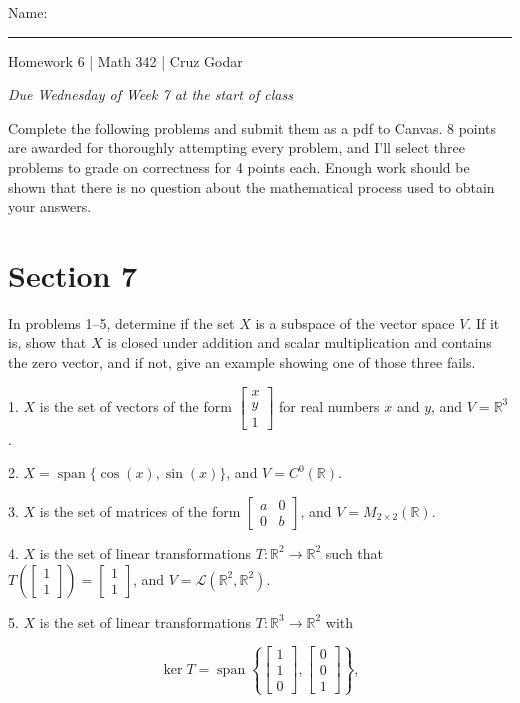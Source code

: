 \documentclass{article}
\begin{document}
\Large Name: \rule{2in}{0.15mm} \hfill Homework 6 | Math 342 | Cruz Godar \vspace{4pt} \normalsize

\textit{Due Wednesday of Week 7 at the start of class}

Complete the following problems and submit them as a pdf to Canvas. 8 points are awarded for thoroughly attempting every problem, and I'll select three problems to grade on correctness for 4 points each. Enough work should be shown that there is no question about the mathematical process used to obtain your answers.

\section{Section 7}

In problems 1--5, determine if the set $X$ is a subspace of the vector space $V$. If it is, show that $X$ is closed under addition and scalar multiplication and contains the zero vector, and if not, give an example showing one of those three fails.

1. $X$ is the set of vectors of the form $\left[\begin{array}{c} x \\ y \\ 1 \end{array}\right]$ for real numbers $x$ and $y$, and $V = \mathbb{R}^3$.

2. $X = \operatorname{span} \{ \cos(x), \sin(x) \}$, and $V = C^0(\mathbb{R})$.

3. $X$ is the set of matrices of the form $\left[\begin{array}{cc} a& 0 \\ 0& b \end{array}\right]$, and $V = M_{2 \times 2}(\mathbb{R})$.

4. $X$ is the set of linear transformations $T : \mathbb{R}^2 \to \mathbb{R}^2$ such that $T \left( \left[\begin{array}{c} 1 \\ 1 \end{array}\right] \right) = \left[\begin{array}{c} 1 \\ 1 \end{array}\right]$, and $V = \mathcal{L}(\mathbb{R}^2, \mathbb{R}^2)$.

5. $X$ is the set of linear transformations $T : \mathbb{R}^3 \to \mathbb{R}^2$ with

$$
	\ker T = \operatorname{span}\left\{ \left[\begin{array}{c} 1 \\ 1 \\ 0 \end{array}\right], \left[\begin{array}{c} 0 \\ 0 \\ 1 \end{array}\right] \right\},
$$
\end{document}

